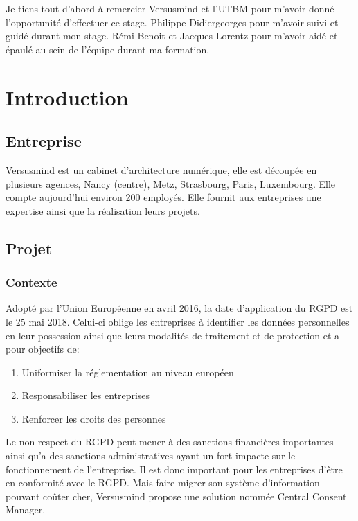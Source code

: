 \documentclass[12pt, a4paper]{report}
\newcommand\tab[1][1cm]{\hspace*{#1}}
\begin{document}
	\makeutbmfrontcover{}
        Je tiens tout d'abord à remercier Versusmind et l'UTBM pour m'avoir donné l'opportunité d'effectuer ce stage.\newline\newline
        Philippe Didiergeorges pour m'avoir suivi et guidé durant mon stage.\newline\newline
        Rémi Benoit et Jacques Lorentz pour m'avoir aidé et épaulé au sein de l'équipe durant ma formation.
    \newpage
    \tableofcontents
    \chapter{Introduction}
        \section{Entreprise}
            \tab{} Versusmind est un cabinet d'architecture numérique, elle est découpée en plusieurs agences, Nancy (centre), Metz, Strasbourg, Paris, Luxembourg.\newline
            Elle compte aujourd'hui environ 200 employés. Elle fournit aux entreprises une expertise ainsi que la réalisation leurs projets.
        \section{Projet}
            \subsection{Contexte}
                \tab{} Adopté par l’Union Européenne en avril 2016, la date d’application du RGPD est le 25 mai 2018. Celui-ci oblige les entreprises à identifier les données personnelles en leur possession ainsi que leurs modalités de traitement et de protection et a pour objectifs de\@:
                \begin{enumerate}
                    \item Uniformiser la réglementation au niveau européen
                    \item Responsabiliser les entreprises
                    \item Renforcer les droits des personnes
                \end{enumerate}
                \tab{} Le non-respect du RGPD peut mener à des sanctions financières importantes ainsi qu'a des sanctions administratives ayant un fort impacte sur le fonctionnement de l'entreprise.
                Il est donc important pour les entreprises d'être en conformité avec le RGPD.\newline
                Mais faire migrer son système d'information pouvant coûter cher, Versusmind propose une solution nommée Central Consent Manager.
\end{document}
